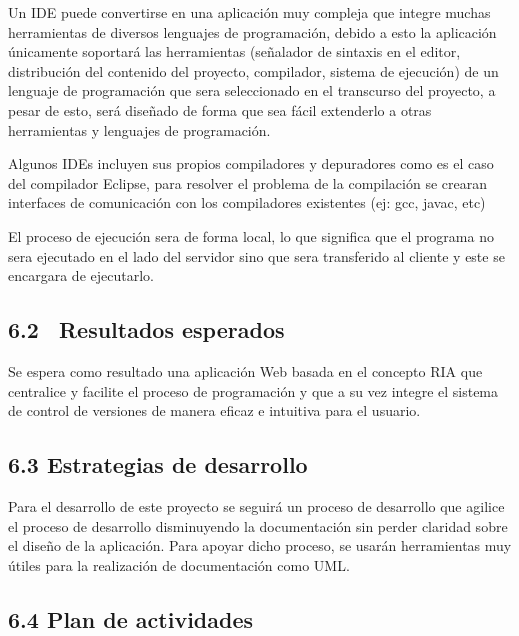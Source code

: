 \documentclass[12pt,letterpaper,oneside]{article}
\begin{document}
\bigskip

Un IDE puede convertirse en una aplicación muy compleja que integre
muchas herramientas de diversos lenguajes de programación, debido a
esto la aplicación únicamente soportará las herramientas
(señalador de sintaxis en el editor, distribución del contenido del
proyecto, compilador, sistema de ejecución) de un lenguaje de
programación que sera seleccionado en el transcurso del proyecto, a
pesar de esto, será diseñado de forma que sea fácil extenderlo a
otras herramientas y lenguajes de programación.


\bigskip

Algunos IDEs incluyen sus propios compiladores y depuradores como es el
caso del compilador Eclipse, para resolver el problema de la
compilación se crearan interfaces de comunicación con los
compiladores existentes (ej: gcc, javac, etc)


\bigskip

El proceso de ejecución sera de forma local, lo que significa que el
programa no sera ejecutado en el lado del servidor sino que sera
transferido al cliente y este se encargara de ejecutarlo.


\bigskip

\subsection[6.2 \ Resultados esperados]{6.2 \ Resultados esperados}

\bigskip

Se espera como resultado una aplicación Web basada en el concepto RIA
que centralice y facilite el proceso de programación y que a su vez
integre el sistema de control de versiones de manera eficaz e intuitiva
para el usuario.


\bigskip

\subsection{6.3 Estrategias de desarrollo}

\bigskip

Para el desarrollo de este
proyecto se seguirá un proceso de desarrollo que agilice el proceso
de desarrollo disminuyendo la documentación sin perder claridad sobre
el diseño de la aplicación. Para apoyar dicho proceso, se usarán
herramientas muy útiles para la realización de documentación
como UML.


\bigskip

\subsection{6.4 Plan de actividades}
\end{document}

